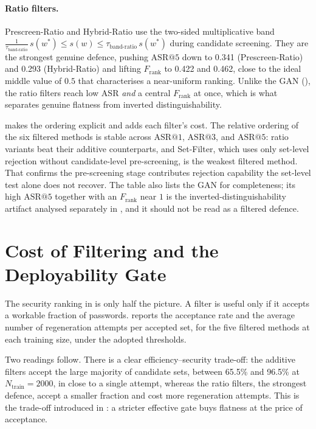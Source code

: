 \paragraph{Ratio filters.}
Prescreen-Ratio and Hybrid-Ratio use the two-sided multiplicative band
$\tfrac{1}{\tau_{\text{band-ratio}}}\, s(w^{*}) \le s(w) \le
\tau_{\text{band-ratio}}\, s(w^{*})$ during candidate screening. They
are the strongest genuine defence, pushing $\mathrm{ASR}@5$ down to
0.341 (Prescreen-Ratio) and 0.293 (Hybrid-Ratio) and lifting
$F_{\text{rank}}$ to 0.422 and 0.462, close to the ideal middle value of
$0.5$ that characterises a near-uniform ranking. Unlike the GAN
(), the ratio filters reach low $\mathrm{ASR}$
\emph{and} a central $F_{\text{rank}}$ at once, which is what separates
genuine flatness from inverted distinguishability.



 makes the ordering explicit and adds each
filter's cost. The relative ordering of the six filtered methods is
stable across $\mathrm{ASR}@1$, $\mathrm{ASR}@3$, and $\mathrm{ASR}@5$:
ratio variants beat their additive counterparts, and Set-Filter, which
uses only set-level rejection without candidate-level pre-screening, is
the weakest filtered method. That confirms the pre-screening stage
contributes rejection capability the set-level test alone does not
recover. The table also lists the GAN for completeness; its high
$\mathrm{ASR}@5$ together with an $F_{\text{rank}}$ near $1$ is the
inverted-distinguishability artifact analysed separately in
, and it should not be read as a filtered defence.

\section{Cost of Filtering and the Deployability Gate}
\label{sec:results-cost}

The security ranking in  is only half the picture.
A filter is useful only if it accepts a workable fraction of passwords.
 reports the acceptance rate and the average number of
regeneration attempts per accepted set, for the five filtered methods at
each training size, under the adopted thresholds.



Two readings follow. There is a clear efficiency--security trade-off:
the additive filters accept the large majority of candidate sets,
between 65.5\% and 96.5\% at $N_{\text{train}} = 2000$, in close to a
single attempt, whereas the ratio filters, the strongest defence, accept
a smaller fraction and cost more regeneration attempts. This is the
trade-off introduced in : a stricter
effective gate buys flatness at the price of acceptance.

